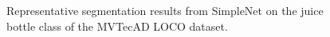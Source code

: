 \begin{figure}[htbp]
\begin{subfigure}[b]{0.3\textwidth}
    \end{subfigure}
    \caption{Representative segmentation results from SimpleNet \cite{liu2023simplenet} on the juice bottle class of the MVTecAD LOCO \cite{LOCODentsAndScratchesBergmann2022} dataset.}
    \label{fig:SNJB}
\end{figure}